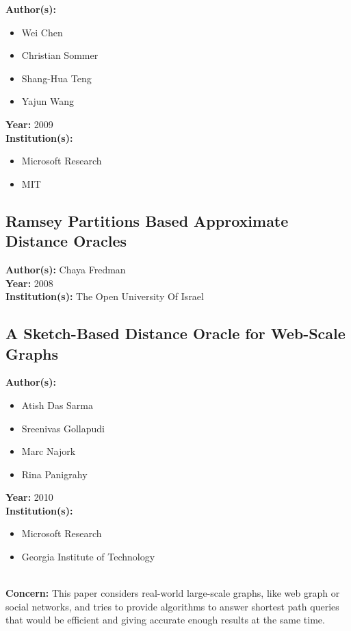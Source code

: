 \documentclass[a4paper]{article}
\newenvironment{itemizesp}
{
    \begin{itemize}
}
{
    \end{itemize}
}
\newcommand{\textbff}[1]{{\large \textbf{#1}}}
\begin{document}
        \textbff{Author(s): }
        \begin{itemizesp}
            \item Wei Chen
            \item Christian Sommer
            \item Shang-Hua Teng
            \item Yajun Wang
        \end{itemizesp}
        \textbff{Year: } 2009\\
        \textbff{Institution(s): }
        \begin{itemizesp}
            \item Microsoft Research
            \item MIT
        \end{itemizesp}


        \subsection{Ramsey Partitions Based Approximate Distance Oracles}
        \label{subsec:ramseyphd}

        \textbff{Author(s): } Chaya Fredman \\
        \textbff{Year: }2008 \\
        \textbff{Institution(s): } The Open University Of Israel \\

        \subsection{A Sketch-Based Distance Oracle for Web-Scale Graphs}
        \label{subsec:sketchbased}

        \textbff{Author(s): }
        \begin{itemizesp}
            \item Atish Das Sarma
            \item Sreenivas Gollapudi
            \item Marc Najork
            \item Rina Panigrahy
        \end{itemizesp}
        \textbff{Year: }2010 \\
        \textbff{Institution(s): }
        \begin{itemizesp}
            \item Microsoft Research
            \item Georgia Institute of Technology
        \end{itemizesp}
        \hspace*{\fill} \\
        \textbff{Concern:} This paper considers real-world large-scale graphs, like web graph or social networks, and tries to provide algorithms to answer shortest path queries that would be efficient and giving accurate enough results at the same time. \\
\end{document}
